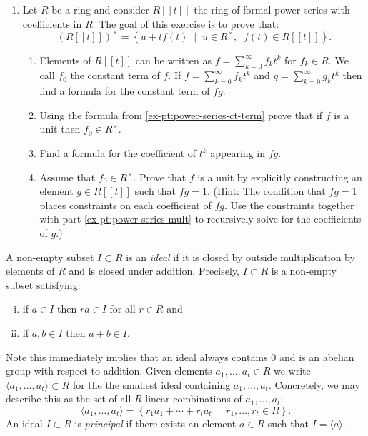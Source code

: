 \documentclass[12pt,reqno]{amsart}
\begin{document}
\begin{enumerate}[leftmargin=*]
	 \item Let $R$ be a ring and consider $R[[t]]$ the ring of formal power series with coefficients in $R$. The goal of this exercise is to prove that:
	 \[
	 \left(R[[t]]\right)^{\times} = \left\{ u + tf(t) \;\; \big| \;\; u \in R^{\times}, \;\; f(t) \in R[[t]] \right\}.
	 \]
	 \begin{enumerate}[label=(\alph*),ref=\theenumi\alph*]
	 	\item\label{ex-pt:power-series-ct-term} Elements of $R[[t]]$ can be written as $f=\sum_{k=0}^{\infty} f_k t^k$ for $f_{k} \in R$. We call $f_0$ the constant term of $f$. If $f=\sum_{k=0}^{\infty} f_k t^k$ and $g=\sum_{k=0}^{\infty} g_k t^k$ then find a formula for the constant term of $fg$. 
		\item Using the formula from \ref{ex-pt:power-series-ct-term} prove that if $f$ is a unit then $f_0 \in R^{\times}$. 
		\item\label{ex-pt:power-series-mult} Find a formula for the coefficient of $t^k$ appearing in $fg$. 
		\item Assume that $f_0 \in R^{\times}$. Prove that $f$ is a unit by explicitly constructing an element $g \in R[[t]]$ such that $fg = 1$. (Hint: The condition that $fg = 1$ places constraints on each coefficient of $fg$. Use the constraints together with part \ref{ex-pt:power-series-mult} to recursively solve for the coefficients of $g$.)	\end{enumerate}	
\end{enumerate}	

\hrulefill

A non-empty subset $I \subset R$ is an \emph{ideal} if it is closed by outside multiplication by elements of $R$ and is closed under addition. Precisely, $I\subset R$ is a non-empty subset satisfying:
\begin{enumerate}[(i)]
	\item if $a \in I$ then $ra \in I$ for all $r \in R$ and
	\item if $a,b \in I$ then $a+b \in I$. 
\end{enumerate}
Note this immediately implies that an ideal always contains $0$ and is an abelian group with respect to addition. Given elements $a_1,\ldots,a_t \in R$ we write $\langle a_1,\ldots, a_t\rangle \subset R$ for the the smallest ideal containing $a_1,\ldots,a_t$. Concretely, we may describe this as the set of all $R$-linear combinations of $a_1,\ldots, a_t$:
\[
\langle a_1,\ldots,a_t \rangle = \left\{ r_1a_1+\cdots +r_ta_t \;\; \big|\;\; r_1,\ldots,r_t\in R\right\}.
\]
An ideal $I \subset R$ is \emph{principal} if there exists an element $a\in R$ such that $I = \langle a \rangle$. 
\end{document}
